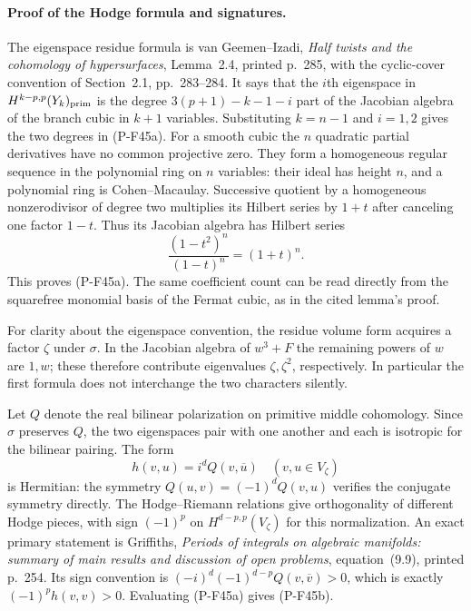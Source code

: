 \paragraph{Proof of the Hodge formula and signatures.}
The eigenspace residue formula is van Geemen--Izadi,
\emph{Half twists and the cohomology of hypersurfaces},
Lemma~2.4, printed p.~285, with the cyclic-cover convention
of Section~2.1, pp.~283--284. It says that the $i$th
eigenspace in $H^{k-p,p}(Y_k)_{\rm prim}$ is the degree
$3(p+1)-k-1-i$ part of the Jacobian algebra of the branch
cubic in $k+1$ variables. Substituting $k=n-1$ and
$i=1,2$ gives the two degrees in (P-F45a).
For a smooth cubic the $n$ quadratic partial derivatives
have no common projective zero. They form a homogeneous
regular sequence in the polynomial ring on $n$ variables:
their ideal has height $n$, and a polynomial ring is
Cohen--Macaulay. Successive quotient by a homogeneous
nonzerodivisor of degree two multiplies its Hilbert series
by $1+t$ after canceling one factor $1-t$. Thus its
Jacobian algebra has Hilbert series
\[
                      \frac{(1-t^2)^n}{(1-t)^n}
                            =(1+t)^n.
\]
This proves (P-F45a). The same coefficient count can be
read directly from the squarefree monomial basis of the
Fermat cubic, as in the cited lemma's proof.

For clarity about the eigenspace convention, the residue
volume form acquires a factor $\zeta$ under $\sigma$.
In the Jacobian algebra of $w^3+F$ the remaining powers
of $w$ are $1,w$; these therefore contribute eigenvalues
$\zeta,\zeta^2$, respectively. In particular the first
formula does not interchange the two characters silently.

Let $Q$ denote the real bilinear polarization on primitive
middle cohomology. Since $\sigma$ preserves $Q$, the two
eigenspaces pair with one another and each is isotropic
for the bilinear pairing. The form
\[
                        h(v,u)=i^d Q(v,\overline u)
                        \quad(v,u\in V_\zeta)
\]
is Hermitian: the symmetry $Q(u,v)=(-1)^dQ(v,u)$ verifies
the conjugate symmetry directly. The Hodge--Riemann
relations give orthogonality of different Hodge pieces,
with sign $(-1)^p$ on $H^{d-p,p}(V_\zeta)$ for this
normalization. An exact primary statement is Griffiths,
\emph{Periods of integrals on algebraic manifolds: summary
of main results and discussion of open problems},
equation~(9.9), printed p.~254. Its sign convention is
$(-i)^d(-1)^{d-p}Q(v,\overline v)>0$, which is exactly
$(-1)^p h(v,v)>0$. Evaluating (P-F45a) gives (P-F45b).

